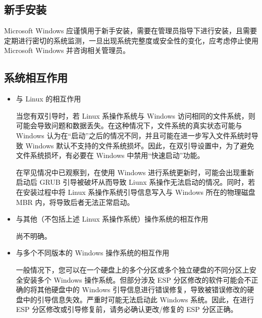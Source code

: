 \documentclass{article}
\begin{document}
\begin{multicols*}{3}
	\medskip

	\begin{tcolorbox}
 	\section*{新手安装}
 	\end{tcolorbox}

	 Microsoft Windows 应谨慎用于新手安装，需要在管理员指导下进行安装，且需要定期进行密切的系统监测，一旦出现系统完整度或安全性的变化，应考虑停止使用 Microsoft Windows 并咨询相关管理员。





	\begin{tcolorbox}
	\section*{系统相互作用}
	\end{tcolorbox}
	\begin{itemize}[leftmargin=*]
		\setlength{\parindent}{0pt}

		\item 与 Linux 的相互作用

		当您有双引导时，若 Linux 系操作系统与 Windows 访问相同的文件系统，则可能会导致问题和数据丢失。在这种情况下，文件系统的真实状态可能与 Windows 认为在“启动”之后的情况不同，并且可能在进一步写入文件系统时导致 Windows 默认不支持的文件系统损坏。因此，在双引导设置中，为了避免文件系统损坏，有必要在 Windows 中禁用“快速启动”功能。

		在罕见情况中已观察到，在使用 Windows 进行系统更新时，可能会出现重新启动后 GRUB 引导被破坏从而导致 Liunx 系操作无法启动的情况。同时，若在安装过程中将 Linux 系操作系统引导信息写入与 Windows 所在的物理磁盘 MBR 内，将导致后者无法正常启动。

		\item 与其他（不包括上述 Linux 系操作系统）操作系统的相互作用

		尚不明确。

		\item 与多个不同版本的 Windows 操作系统的相互作用
		
		一般情况下，您可以在一个硬盘上的多个分区或多个独立硬盘的不同分区上安全安装多个 Windows 操作系统。但部分涉及 ESP 分区修改的软件可能会不正确的将其他硬盘中的 Windows 引导信息进行错误修复，导致被错误修改的硬盘中的引导信息失效。严重时可能无法启动此 Windows 系统。因此，在进行 ESP 分区修改或引导修复前，请务必确认更改/修复的 ESP 分区正确。


\end{itemize}
\end{multicols*}
\end{document}

